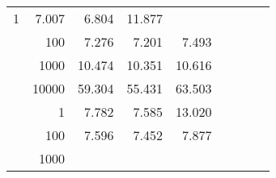 \begin{table}
\begin{tabular}{rrrrrrrrr}
					
					 
					\multirow{ 1 }{*}{ 1 } &
					
						
							    
							    
	                           7.007 & 6.804 & 11.877  \\
	                
	            
					 &  
					 
					\multirow{ 1 }{*}{ 100 } &
					
						
							    
							    
	                           7.276 & 7.201 & 7.493  \\
	                
	            
					 &  
					 
					\multirow{ 1 }{*}{ 1000 } &
					
						
							    
							    
	                           10.474 & 10.351 & 10.616  \\
	                
	            
					 &  
					 
					\multirow{ 1 }{*}{ 10000 } &
					
						
							    
							    
	                           59.304 & 55.431 & 63.503  \\
	                
	            
	        
				\noalign{\smallskip}\hline
				\multirow{ 4 }{*}{ 160000 } &
				
					
					 
					\multirow{ 1 }{*}{ 1 } &
					
						
							    
							    
	                           7.782 & 7.585 & 13.020  \\
	                
	            
					 &  
					 
					\multirow{ 1 }{*}{ 100 } &
					
						
							    
							    
	                           7.596 & 7.452 & 7.877  \\
	                
	            
					 &  
					 
					\multirow{ 1 }{*}{ 1000 } &
					

\end{tabular}
\end{table}
